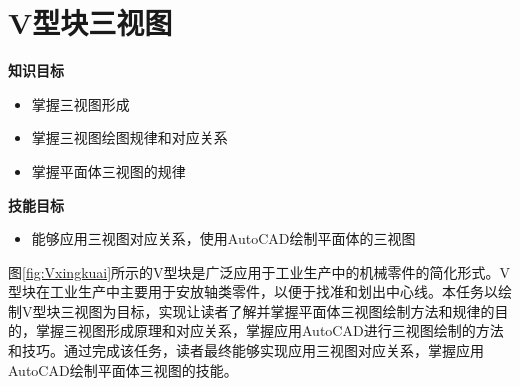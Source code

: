 \section{V型块三视图}
{\bfseries 知识目标}
\begin{itemize}
\item 掌握三视图形成
\item 掌握三视图绘图规律和对应关系
\item 掌握平面体三视图的规律
\end{itemize}

{\bfseries 技能目标}
\begin{itemize}
\item 能够应用三视图对应关系，使用AutoCAD绘制平面体的三视图
\end{itemize}

图\ref{fig:Vxingkuai}所示的V型块是广泛应用于工业生产中的机械零件的简化形式。V型块在工业生产中主要用于安放轴类零件，以便于找准和划出中心线。本任务以绘制V型块三视图为目标，实现让读者了解并掌握平面体三视图绘制方法和规律的目的，掌握三视图形成原理和对应关系，掌握应用AutoCAD进行三视图绘制的方法和技巧。通过完成该任务，读者最终能够实现应用三视图对应关系，掌握应用AutoCAD绘制平面体三视图的技能。
\noindent
